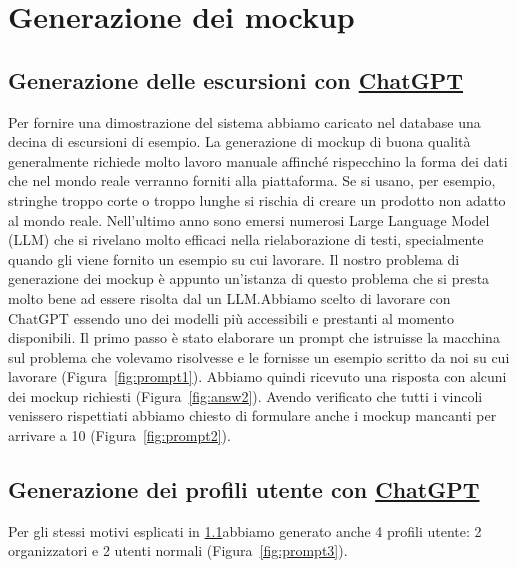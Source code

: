 \section{Generazione dei mockup}
\subsection{Generazione delle escursioni con \href{https://chat.openai.com/auth/login}{ChatGPT}}\label{sect:genEventi}
Per fornire una dimostrazione del sistema abbiamo caricato nel database una decina di escursioni di esempio.
La generazione di mockup di buona qualità generalmente richiede molto lavoro manuale affinché rispecchino la forma dei dati
che nel mondo reale verranno forniti alla piattaforma. Se si usano, per esempio, stringhe troppo corte o troppo lunghe si rischia di creare
un prodotto non adatto al mondo reale.
Nell'ultimo anno sono emersi numerosi Large Language Model (LLM) che si rivelano molto efficaci nella rielaborazione di testi, specialmente quando gli viene 
fornito un esempio su cui lavorare. Il nostro problema di generazione dei mockup è appunto un'istanza di questo problema che si presta molto bene ad essere
risolta dal un LLM\@.Abbiamo scelto di lavorare con ChatGPT essendo uno dei modelli più accessibili e prestanti al momento disponibili.
Il primo passo è stato elaborare un prompt che istruisse la macchina sul problema che volevamo risolvesse e le fornisse un esempio scritto da noi su cui lavorare (Figura~\ref*{fig:prompt1}).
Abbiamo quindi ricevuto una risposta con alcuni dei mockup richiesti (Figura~\ref*{fig:answ2}).
Avendo verificato che tutti i vincoli venissero rispettiati abbiamo chiesto di formulare anche i mockup mancanti per arrivare a 10 (Figura~\ref*{fig:prompt2}).
\subsection{Generazione dei profili utente con \href{https://chat.openai.com/auth/login}{ChatGPT}}
Per gli stessi motivi esplicati in \ref*{sect:genEventi}abbiamo generato anche 4 profili utente: 2 organizzatori e 2 utenti normali (Figura~\ref*{fig:prompt3}).
\newpage

